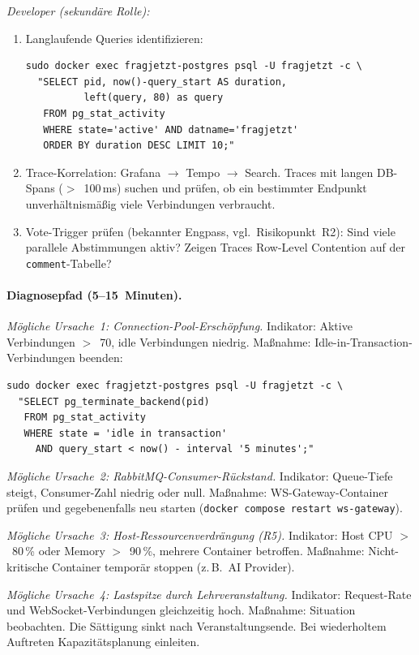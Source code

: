\emph{Developer (sekundäre Rolle):}
\begin{enumerate}
  \item Langlaufende Queries identifizieren:
\begin{lstlisting}[style=bashstyle]
sudo docker exec fragjetzt-postgres psql -U fragjetzt -c \
  "SELECT pid, now()-query_start AS duration,
          left(query, 80) as query
   FROM pg_stat_activity
   WHERE state='active' AND datname='fragjetzt'
   ORDER BY duration DESC LIMIT 10;"
\end{lstlisting}
  \item Trace-Korrelation: Grafana $\rightarrow$ Tempo $\rightarrow$ Search. Traces mit langen DB-Spans ($>$~100\,ms) suchen und prüfen, ob ein bestimmter Endpunkt unverhältnismäßig viele Verbindungen verbraucht.
  \item Vote-Trigger prüfen (bekannter Engpass, vgl.\ Risikopunkt~R2): Sind viele parallele Abstimmungen aktiv? Zeigen Traces Row-Level Contention auf der \texttt{comment}-Tabelle?
\end{enumerate}

\paragraph{Diagnosepfad (5--15~Minuten).}

\emph{Mögliche Ursache~1: Connection-Pool-Erschöpfung.} Indikator: Aktive Verbindungen $>$~70, idle Verbindungen niedrig. Maßnahme: Idle-in-Transaction-Verbindungen beenden:
\begin{lstlisting}[style=bashstyle]
sudo docker exec fragjetzt-postgres psql -U fragjetzt -c \
  "SELECT pg_terminate_backend(pid)
   FROM pg_stat_activity
   WHERE state = 'idle in transaction'
     AND query_start < now() - interval '5 minutes';"
\end{lstlisting}

\emph{Mögliche Ursache~2: RabbitMQ-Consumer-Rückstand.} Indikator: Queue-Tiefe steigt, Consumer-Zahl niedrig oder null. Maßnahme: WS-Gateway-Container prüfen und gegebenenfalls neu starten (\texttt{docker compose restart ws-gateway}).

\emph{Mögliche Ursache~3: Host-Ressourcenverdrängung (R5).} Indikator: Host CPU $>$~80\,\% oder Memory $>$~90\,\%, mehrere Container betroffen. Maßnahme: Nicht-kritische Container temporär stoppen (z.\,B.\ AI Provider).

\emph{Mögliche Ursache~4: Lastspitze durch Lehrveranstaltung.} Indikator: Request-Rate und WebSocket-Verbindungen gleichzeitig hoch. Maßnahme: Situation beobachten. Die Sättigung sinkt nach Veranstaltungsende. Bei wiederholtem Auftreten Kapazitätsplanung einleiten.

